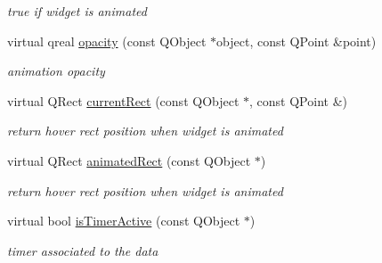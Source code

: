 \begin{DoxyCompactItemize}
\begin{DoxyCompactList}\small\item\em true if widget is animated \end{DoxyCompactList}\item 
\mbox{\label{class_menu_bar_engine_v2_a0b129e27dbab99f7778f23bb43b2519c}} 
virtual qreal \hyperlink{class_menu_bar_engine_v2_a0b129e27dbab99f7778f23bb43b2519c}{opacity} (const Q\+Object $\ast$object, const Q\+Point \&point)
\begin{DoxyCompactList}\small\item\em animation opacity \end{DoxyCompactList}\item 
\mbox{\label{class_menu_bar_engine_v2_a1da64a0788946bdfdd4ed64003fb87c7}} 
virtual Q\+Rect \hyperlink{class_menu_bar_engine_v2_a1da64a0788946bdfdd4ed64003fb87c7}{current\+Rect} (const Q\+Object $\ast$, const Q\+Point \&)
\begin{DoxyCompactList}\small\item\em return \textquotesingle{}hover\textquotesingle{} rect position when widget is animated \end{DoxyCompactList}\item 
\mbox{\label{class_menu_bar_engine_v2_a6353634bf6e33a494dd19cfdedba7a93}} 
virtual Q\+Rect \hyperlink{class_menu_bar_engine_v2_a6353634bf6e33a494dd19cfdedba7a93}{animated\+Rect} (const Q\+Object $\ast$)
\begin{DoxyCompactList}\small\item\em return \textquotesingle{}hover\textquotesingle{} rect position when widget is animated \end{DoxyCompactList}\item 
\mbox{\label{class_menu_bar_engine_v2_a09a001157810cbcff22213fa34f6dab6}} 
virtual bool \hyperlink{class_menu_bar_engine_v2_a09a001157810cbcff22213fa34f6dab6}{is\+Timer\+Active} (const Q\+Object $\ast$)
\begin{DoxyCompactList}\small\item\em timer associated to the data \end{DoxyCompactList}\item 
\mbox{\label{class_menu_bar_engine_v2_a44d0b1e4a7de16f0060d0dd189695312}} 

\end{DoxyCompactItemize}
